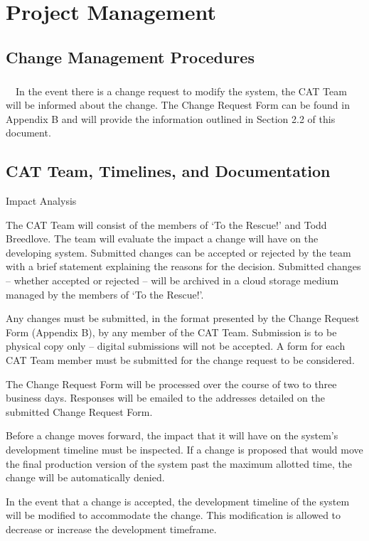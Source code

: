 \documentclass[12pt]{report}
\begin{document}
\chapter{Project Management}
\thispagestyle{fancy}

	\section{Change Management Procedures}
	\paragraph{}\ \ In the event there is a change request to modify the system, the CAT Team will be informed about the change. The Change Request Form can be found in Appendix B and will provide the information outlined in Section 2.2 of this document. 
	
	\section{CAT Team, Timelines, and Documentation}
	\begin{labeling}{Impact Analysis}
		\item [CAT Team] The CAT Team will consist of the members of ‘To the Rescue!’ and Todd Breedlove. The team will evaluate the impact a change will have on the developing system. Submitted changes can be accepted or rejected by the team with a brief statement explaining the reasons for the decision. Submitted changes – whether accepted or rejected – will be archived in a cloud storage medium managed by the members of ‘To the Rescue!’.
		\item [Medium] Any changes must be submitted, in the format presented by the Change Request Form (Appendix B), by any member of the CAT Team. Submission is to be physical copy only – digital submissions will not be accepted. A form for each CAT Team member must be submitted for the change request to be considered.
		\item [Response Time] The Change Request Form will be processed over the course of two to three business days. Responses will be emailed to the addresses detailed on the submitted Change Request Form. 
		\item [Impact Analysis] Before a change moves forward, the impact that it will have on the system’s development timeline must be inspected. If a change is proposed that would move the final production version of the system past the maximum allotted time, the change will be automatically denied. 
		\item [Time Frame] In the event that a change is accepted, the development timeline of the system will be modified to accommodate the change. This modification is allowed to decrease or increase the development timeframe.  
	\end{labeling}
\end{document}
